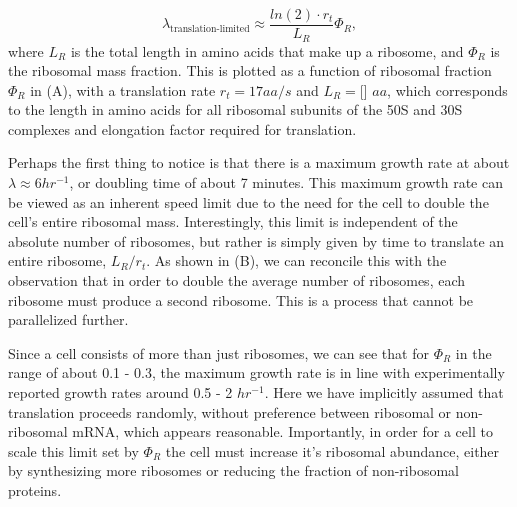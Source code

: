 \begin{equation}
\lambda_{\textrm{translation-limited}} \approx \frac{ln(2) \cdot r_t}{L_R}  \Phi_R,
\end{equation}
where $L_R$ is the total length in amino acids that make up a ribosome, and
$\Phi_R$ is the ribosomal mass fraction. This is plotted as a function of
ribosomal fraction $\Phi_R$ in (A), with a translation rate
$r_t = 17 aa/s$ and $L_R = $[] $aa$, which corresponds to the length in amino
acids for all ribosomal subunits of the 50S and 30S complexes and elongation
factor required for translation.

Perhaps the first thing to notice is that there is a maximum growth rate at
about $\lambda \approx 6 hr^{-1}$, or doubling time of
about 7 minutes. This maximum growth rate can be viewed as an inherent speed
limit due to the need for the cell to double the cell's entire ribosomal mass.
Interestingly, this limit is independent of the absolute number of ribosomes,
but rather  is simply given by time to translate an entire ribosome, $L_R/ r_t$.
As shown in (B),  we can reconcile this with the observation
that in order  to double the average number of ribosomes, each ribosome must
produce a second  ribosome. This is a process that cannot be parallelized
further.



Since a cell consists of more than just ribosomes, we can see that for $\Phi_R$
in the range of about 0.1 - 0.3, the maximum growth rate is in line with
experimentally reported growth rates around 0.5 - 2 $hr^{-1}$. Here we have
implicitly assumed that translation proceeds randomly, without preference
between ribosomal or non-ribosomal mRNA, which appears reasonable. Importantly,
in order for a cell to scale this limit set by $\Phi_R$ the cell must increase
it's ribosomal abundance, either by synthesizing more ribosomes or reducing the
fraction of non-ribosomal proteins.

